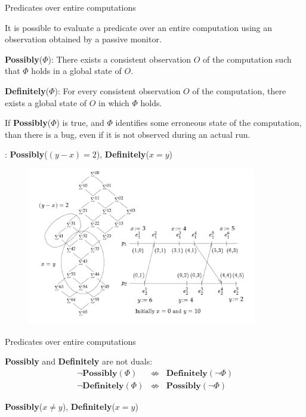 \begin{frame}{Predicates over entire computations}
	
It is possible to evaluate a predicate over an entire computation using
an observation obtained by a passive monitor.

\BI
\item \alert{{\bf Possibly}($\Phi$)}: There exists a consistent observation $O$ 
  of the computation such that $\Phi$ holds in a global state of $O$.
\item \alert{{\bf Definitely}($\Phi$)}: For every consistent observation $O$ of
  the computation, there exists a global state of $O$ in which $\Phi$ holds.
\EI

\begin{example}[Debugging]
If {\bf Possibly}($\Phi$) is true, and $\Phi$ identifies some erroneous state of the
computation, than there is a bug, even if it is not observed during an actual run.
\end{example}

\end{frame}


\begin{frame}

: {\bf Possibly}($(y-x)=2$), {\bf Definitely}($x=y$)
\begin{figure} 
\includegraphics[width=10cm]{figs/03/figure-16.png}
\end{figure}
\end{frame}

\begin{frame}{Predicates over entire computations}

\begin{theorem}
{\bf Possibly} and {\bf Definitely} are not duals:
\begin{eqnarray*}
\neg \mathbf{Possibly}(\Phi) &\not\Leftrightarrow& \mathbf{Definitely}(\neg \Phi) \\
\neg \mathbf{Definitely}(\Phi) &\not\Leftrightarrow& \mathbf{Possibly}(\neg \Phi)
\end{eqnarray*}
\end{theorem}

\bigskip
\begin{example}
{\bf Possibly}($x \neq y$), {\bf Definitely}($x=y$)
\end{example}

\end{frame}

